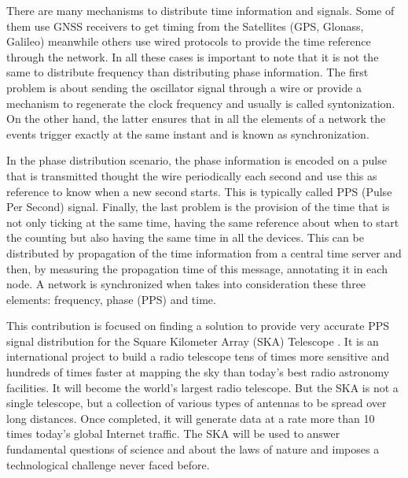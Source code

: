 There are many mechanisms to distribute time information and signals. Some of 
them use GNSS receivers to get timing from the Satellites (GPS, Glonass, 
Galileo) meanwhile others use wired protocols to provide the time reference 
through the network. In all these cases is important to note that it is not the 
same to distribute frequency than distributing phase information. The first 
problem is about sending the oscillator signal through a wire or provide a 
mechanism to regenerate the clock frequency and usually is called 
syntonization. On the other hand, the latter ensures that in all the elements 
of a network the events trigger exactly at the same instant and is known as 
synchronization. 

In the phase distribution scenario, the phase information is encoded on a pulse that is transmitted thought the wire periodically each second and use this as reference to know when a new second starts. This is typically called PPS (Pulse Per Second) signal. Finally, the last problem is the provision of the time that is not only ticking at the same time, having the same reference about when to start the counting but also having the same time in all the devices. This can be distributed by propagation of the time information from a central time server and then, by measuring the propagation time of this message, annotating it in each node. A network is synchronized when takes into consideration these three elements: frequency, phase (PPS) and time.

This contribution is focused on finding a solution to provide very accurate PPS 
signal distribution for the Square Kilometer Array (SKA) Telescope 
\cite{ska:project_website}. It is an international project to build a radio 
telescope tens of times more sensitive and hundreds of times faster at mapping 
the sky than today’s best radio astronomy facilities. It will become the 
world’s largest radio telescope. But the SKA is not a single telescope, but a 
collection of various types of antennas to be spread over long distances. Once 
completed, it will generate data at a rate more than 10 times today’s global 
Internet traffic. The SKA will be used to answer fundamental questions of 
science and about the laws of nature and imposes a technological challenge 
never faced before. 

